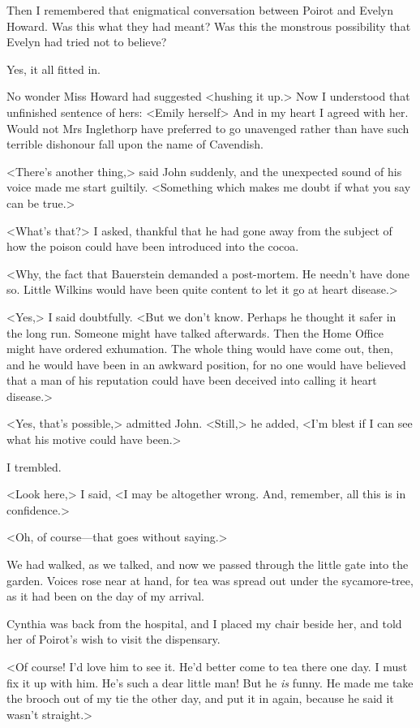  Then I remembered that enigmatical conversation between Poirot and Evelyn Howard. Was this what they had meant? Was this the monstrous possibility that Evelyn had tried not to believe? 

 Yes, it all fitted in. 

 No wonder Miss Howard had suggested <hushing it up.> Now I understood that unfinished sentence of hers: <Emily herself\longdash> And in my heart I agreed with her. Would not Mrs Inglethorp have preferred to go unavenged rather than have such terrible dishonour fall upon the name of Cavendish. 

 <There's another thing,> said John suddenly, and the unexpected sound of his voice made me start guiltily. <Something which makes me doubt if what you say can be true.> 

 <What's that?> I asked, thankful that he had gone away from the subject of how the poison could have been introduced into the cocoa. 

 <Why, the fact that Bauerstein demanded a post-mortem. He needn't have done so. Little Wilkins would have been quite content to let it go at heart disease.> 

 <Yes,> I said doubtfully. <But we don't know. Perhaps he thought it safer in the long run. Someone might have talked afterwards. Then the Home Office might have ordered exhumation. The whole thing would have come out, then, and he would have been in an awkward position, for no one would have believed that a man of his reputation could have been deceived into calling it heart disease.> 

 <Yes, that's possible,> admitted John. <Still,> he added, <I'm blest if I can see what his motive could have been.> 

 I trembled. 

 <Look here,> I said, <I may be altogether wrong. And, remember, all this is in confidence.> 

 <Oh, of course—that goes without saying.> 

 We had walked, as we talked, and now we passed through the little gate into the garden. Voices rose near at hand, for tea was spread out under the sycamore-tree, as it had been on the day of my arrival. 

 Cynthia was back from the hospital, and I placed my chair beside her, and told her of Poirot's wish to visit the dispensary. 

 <Of course! I'd love him to see it. He'd better come to tea there one day. I must fix it up with him. He's such a dear little man! But he \emph{is} funny. He made me take the brooch out of my tie the other day, and put it in again, because he said it wasn't straight.> 

